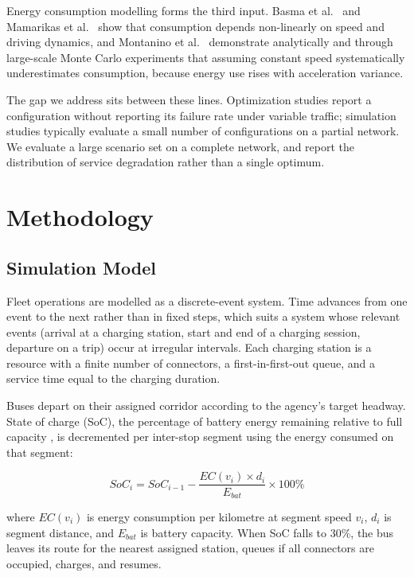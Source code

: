 \documentclass[conference]{IEEEtran}
\begin{document}
Energy consumption modelling forms the third input. Basma et al.\
\cite{basma2020} and Mamarikas et al.\ \cite{mamarikas2025} show that
consumption depends non-linearly on speed and driving dynamics, and
Montanino et al.\ \cite{montanino2025} demonstrate analytically and
through large-scale Monte Carlo experiments that assuming constant speed
systematically underestimates consumption, because energy use rises with
acceleration variance.

The gap we address sits between these lines. Optimization studies report
a configuration without reporting its failure rate under variable
traffic; simulation studies typically evaluate a small number of
configurations on a partial network. We evaluate a large scenario set on
a complete network, and report the distribution of service degradation
rather than a single optimum.

\section{Methodology}

\subsection{Simulation Model}

Fleet operations are modelled as a discrete-event system. Time advances
from one event to the next rather than in fixed steps, which suits a
system whose relevant events (arrival at a charging station, start and
end of a charging session, departure on a trip) occur at irregular
intervals. Each charging station is a resource with a finite number of
connectors, a first-in-first-out queue, and a service time equal to the
charging duration.

Buses depart on their assigned corridor according to the agency's target
headway. State of charge (SoC), the percentage of battery energy
remaining relative to full capacity \cite{hannan2017}, is decremented per
inter-stop segment using the energy consumed on that segment:

\begin{equation}
SoC_i = SoC_{i-1} - \frac{EC(v_i) \times d_i}{E_{bat}} \times 100\%
\label{eq:soc}
\end{equation}

where $EC(v_i)$ is energy consumption per kilometre at segment speed
$v_i$, $d_i$ is segment distance, and $E_{bat}$ is battery capacity. When
SoC falls to 30\%, the bus leaves its route for the nearest assigned
station, queues if all connectors are occupied, charges, and resumes.
\end{document}
